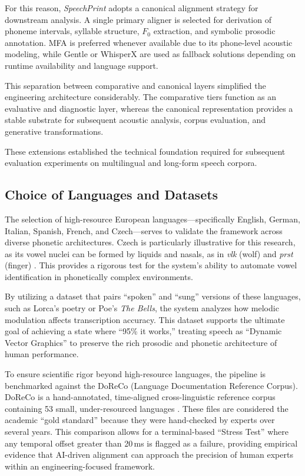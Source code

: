 For this reason, \textit{SpeechPrint} adopts a canonical alignment strategy for downstream analysis. A single primary aligner is selected for derivation of phoneme intervals, syllable structure, \(F_0\) extraction, and symbolic prosodic annotation. MFA is preferred whenever available due to its phone-level acoustic modeling, while Gentle or WhisperX are used as fallback solutions depending on runtime availability and language support.

This separation between comparative and canonical layers simplified the engineering architecture considerably. The comparative tiers function as an evaluative and diagnostic layer, whereas the canonical representation provides a stable substrate for subsequent acoustic analysis, corpus evaluation, and generative transformations.

These extensions established the technical foundation required for subsequent evaluation experiments on multilingual and long-form speech corpora.

\subsection{Choice of Languages and Datasets}

The selection of high-resource European languages---specifically English, German, Italian, Spanish, French, and Czech---serves to validate the framework across diverse phonetic architectures. Czech is particularly illustrative for this research, as its vowel nuclei can be formed by liquids and nasals, as in \textit{vlk} (wolf) and \textit{prst} (finger) \cite{paschen2020doreco}. This provides a rigorous test for the system’s ability to automate vowel identification in phonetically complex environments.

By utilizing a dataset that pairs ``spoken'' and ``sung'' versions of these languages, such as Lorca’s poetry or Poe’s \textit{The Bells}, the system analyzes how melodic modulation affects transcription accuracy. This dataset supports the ultimate goal of achieving a state where ``95\% it works,'' treating speech as ``Dynamic Vector Graphics'' to preserve the rich prosodic and phonetic architecture of human performance.

To ensure scientific rigor beyond high-resource languages, the pipeline is benchmarked against the DoReCo (Language Documentation Reference Corpus). DoReCo is a hand-annotated, time-aligned cross-linguistic reference corpus containing 53 small, under-resourced languages \cite{paschen2020doreco}. These files are considered the academic ``gold standard'' because they were hand-checked by experts over several years. This comparison allows for a terminal-based ``Stress Test'' where any temporal offset greater than 20\,ms is flagged as a failure, providing empirical evidence that AI-driven alignment can approach the precision of human experts within an engineering-focused framework.

